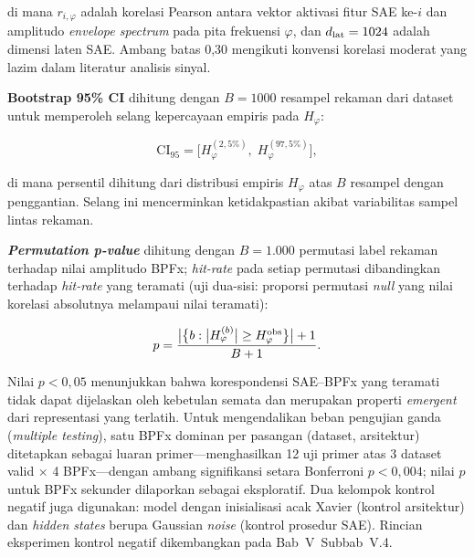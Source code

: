 \noindent di mana $r_{i,\varphi}$ adalah korelasi Pearson antara vektor
aktivasi fitur SAE ke-$i$ dan amplitudo \emph{envelope spectrum} pada pita
frekuensi $\varphi$, dan $d_{\rm lat} = 1024$ adalah dimensi laten SAE.
Ambang batas 0,30 mengikuti konvensi korelasi moderat yang lazim dalam
literatur analisis sinyal.

\textbf{Bootstrap 95\% CI} dihitung dengan $B = 1000$ resampel rekaman dari
dataset untuk memperoleh selang kepercayaan empiris pada $H_\varphi$:

\begin{equation}\label{eq:bab3_bootstrap_ci}
  \text{CI}_{95} = \bigl[H_\varphi^{(2{,}5\%)},\; H_\varphi^{(97{,}5\%)}\bigr],
\end{equation}

\noindent di mana persentil dihitung dari distribusi empiris $H_\varphi$
atas $B$ resampel dengan penggantian. Selang ini mencerminkan ketidakpastian
akibat variabilitas sampel lintas rekaman.

\textbf{\emph{Permutation p-value}} dihitung dengan $B = 1{.}000$ permutasi
label rekaman terhadap nilai amplitudo BPFx; \emph{hit-rate} pada setiap permutasi
dibandingkan terhadap \emph{hit-rate} yang teramati {\color{blue}(uji dua-sisi:
proporsi permutasi \emph{null} yang nilai korelasi absolutnya melampaui nilai teramati)}:%

\begin{equation}\label{eq:bab3_permutation_pvalue}
  p = \frac{\bigl|{\bigl\{b : \bigl|H_\varphi^{(b)}\bigr| \geq H_\varphi^{\rm obs}\bigr\}}\bigr| + 1}
           {B + 1}.
\end{equation}

Nilai $p < 0{,}05$ menunjukkan bahwa korespondensi SAE–BPFx yang teramati
tidak dapat dijelaskan oleh kebetulan semata dan merupakan properti
\emph{emergent} dari representasi yang terlatih. {\color{blue}Untuk
mengendalikan beban pengujian ganda (\emph{multiple testing}), satu BPFx
dominan per pasangan (dataset, arsitektur) ditetapkan sebagai luaran primer---menghasilkan
12 uji primer atas 3 dataset valid $\times$ 4 BPFx---dengan ambang signifikansi setara
Bonferroni $p < 0{,}004$; nilai $p$ untuk BPFx sekunder dilaporkan sebagai
eksploratif.}%
Dua kelompok kontrol negatif juga digunakan:
model dengan inisialisasi acak Xavier (kontrol arsitektur) dan \emph{hidden
states} berupa Gaussian \emph{noise} (kontrol prosedur SAE). Rincian
eksperimen kontrol negatif dikembangkan pada Bab~V~Subbab~V.4.


